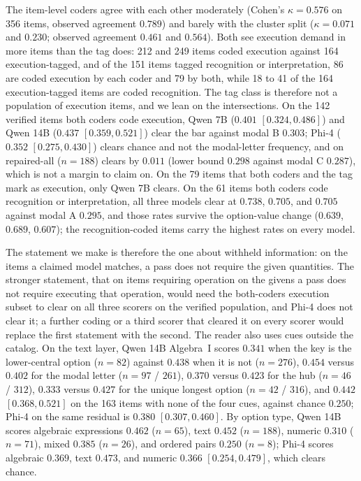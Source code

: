 The item-level coders agree with each other moderately (Cohen's $\kappa=0.576$ on 356 items, observed agreement $0.789$) and barely with the cluster split ($\kappa=0.071$ and $0.230$; observed agreement $0.461$ and $0.564$). Both see execution demand in more items than the tag does: 212 and 249 items coded execution against 164 execution-tagged, and of the 151 items tagged recognition or interpretation, 86 are coded execution by each coder and 79 by both, while 18 to 41 of the 164 execution-tagged items are coded recognition. The tag class is therefore not a population of execution items, and we lean on the intersections. On the 142 verified items both coders code execution, Qwen 7B ($0.401$ $[0.324, 0.486]$) and Qwen 14B ($0.437$ $[0.359, 0.521]$) clear the bar against modal B $0.303$; Phi-4 ($0.352$ $[0.275, 0.430]$) clears chance and not the modal-letter frequency, and on repaired-all ($n=188$) clears by $0.011$ (lower bound $0.298$ against modal C $0.287$), which is not a margin to claim on. On the 79 items that both coders and the tag mark as execution, only Qwen 7B clears. On the 61 items both coders code recognition or interpretation, all three models clear at $0.738$, $0.705$, and $0.705$ against modal A $0.295$, and those rates survive the option-value change ($0.639$, $0.689$, $0.607$); the recognition-coded items carry the highest rates on every model.

The statement we make is therefore the one about withheld information: on the items a claimed model matches, a pass does not require the given quantities. The stronger statement, that on items requiring operation on the givens a pass does not require executing that operation, would need the both-coders execution subset to clear on all three scorers on the verified population, and Phi-4 does not clear it; a further coding or a third scorer that cleared it on every scorer would replace the first statement with the second. The reader also uses cues outside the catalog. On the text layer, Qwen 14B Algebra~I scores $0.341$ when the key is the lower-central option ($n=82$) against $0.438$ when it is not ($n=276$), $0.454$ versus $0.402$ for the modal letter ($n=97$ / $261$), $0.370$ versus $0.423$ for the hub ($n=46$ / $312$), $0.333$ versus $0.427$ for the unique longest option ($n=42$ / $316$), and $0.442$ $[0.368, 0.521]$ on the 163 items with none of the four cues, against chance $0.250$; Phi-4 on the same residual is $0.380$ $[0.307, 0.460]$. By option type, Qwen 14B scores algebraic expressions $0.462$ ($n=65$), text $0.452$ ($n=188$), numeric $0.310$ ($n=71$), mixed $0.385$ ($n=26$), and ordered pairs $0.250$ ($n=8$); Phi-4 scores algebraic $0.369$, text $0.473$, and numeric $0.366$ $[0.254, 0.479]$, which clears chance.


